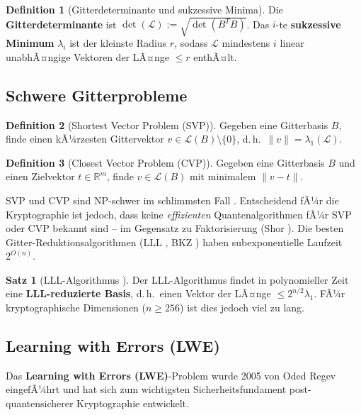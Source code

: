 ﻿\documentclass[a4paper,12pt]{scrreprt}
\theoremstyle{definition}
\newtheorem{definition}{Definition}[section]
\newtheorem{satz}{Satz}[section]
\begin{document}
\begin{definition}[Gitterdeterminante und sukzessive Minima]
Die \textbf{Gitterdeterminante} ist $\det(\mathcal{L}) := \sqrt{\det(B^T B)}$. Das $i$-te \textbf{sukzessive Minimum} $\lambda_i$ ist der kleinste Radius $r$, sodass $\mathcal{L}$ mindestens $i$ linear unabhÃ¤ngige Vektoren der LÃ¤nge $\leq r$ enthÃ¤lt.
\end{definition}

\subsection{Schwere Gitterprobleme}

\begin{definition}[Shortest Vector Problem (SVP)]
Gegeben eine Gitterbasis $B$, finde einen kÃ¼rzesten Gittervektor $v \in \mathcal{L}(B) \setminus \{0\}$, d.\,h.\ $\|v\| = \lambda_1(\mathcal{L})$.
\end{definition}

\begin{definition}[Closest Vector Problem (CVP)]
Gegeben eine Gitterbasis $B$ und einen Zielvektor $t \in \mathbb{R}^m$, finde $v \in \mathcal{L}(B)$ mit minimalem $\|v - t\|$.
\end{definition}

SVP und CVP sind NP-schwer im schlimmsten Fall \cite{MR09}. Entscheidend fÃ¼r die Kryptographie ist jedoch, dass keine \emph{effizienten} Quantenalgorithmen fÃ¼r SVP oder CVP bekannt sind -- im Gegensatz zu Faktorisierung (Shor \cite{Sho94}). Die besten Gitter-Reduktionsalgorith\-men (LLL \cite{LLL82}, BKZ \cite{Sch87}) haben subexponentielle Laufzeit $2^{O(n)}$.

\begin{satz}[LLL-Algorithmus \cite{LLL82}]
Der LLL-Algorithmus findet in polynomieller Zeit eine \textbf{LLL-reduzierte Basis}, d.\,h.\ einen Vektor der LÃ¤nge $\leq 2^{n/2} \lambda_1$. FÃ¼r kryptographische Dimensionen ($n \geq 256$) ist dies jedoch viel zu lang.
\end{satz}

\subsection{Learning with Errors (LWE)}

Das \textbf{Learning with Errors (LWE)}-Problem wurde 2005 von Oded Regev eingefÃ¼hrt \cite{Reg05} und hat sich zum wichtigsten Sicherheitsfundament post-quantensicherer Kryptographie entwickelt.
\end{document}
